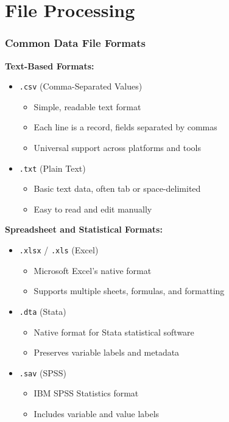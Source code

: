 \documentclass[10pt]{beamer}
\begin{document}
\section{File Processing}

\begin{frame}[fragile]
    \frametitle{Common Data File Formats}
    
    \textbf{Text-Based Formats:}
    \begin{itemize}
        \item \colorbox{gray!20}{\texttt{.csv}} (Comma-Separated Values)
        \begin{itemize}
            \item Simple, readable text format
            \item Each line is a record, fields separated by commas
            \item Universal support across platforms and tools
        \end{itemize}
        \item \colorbox{gray!20}{\texttt{.txt}} (Plain Text)
        \begin{itemize}
            \item Basic text data, often tab or space-delimited
            \item Easy to read and edit manually
        \end{itemize}
    \end{itemize}

    \textbf{Spreadsheet and Statistical Formats:}
    \begin{itemize}
        \item \colorbox{gray!20}{\texttt{.xlsx}} / \texttt{.xls} (Excel)
        \begin{itemize}
            \item Microsoft Excel's native format
            \item Supports multiple sheets, formulas, and formatting
        \end{itemize}
        \item \colorbox{gray!20}{\texttt{.dta}} (Stata)
        \begin{itemize}
            \item Native format for Stata statistical software
            \item Preserves variable labels and metadata
        \end{itemize}
        \item \colorbox{gray!20}{\texttt{.sav}} (SPSS)
        \begin{itemize}
            \item IBM SPSS Statistics format
            \item Includes variable and value labels
        \end{itemize}
    \end{itemize}
\end{frame}
\end{document}
